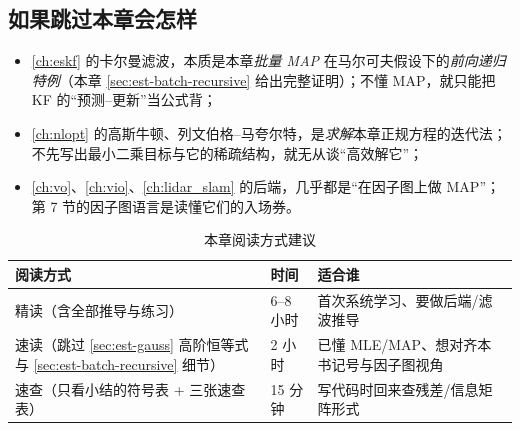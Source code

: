 \subsection*{如果跳过本章会怎样}
\begin{itemize}
  \item \cref{ch:eskf} 的卡尔曼滤波，本质是本章\emph{批量 MAP} 在马尔可夫假设下的\emph{前向递归特例}（本章 \cref{sec:est-batch-recursive} 给出完整证明）；不懂 MAP，就只能把 KF 的“预测–更新”当公式背；
  \item \cref{ch:nlopt} 的高斯牛顿、列文伯格–马夸尔特，是\emph{求解}本章正规方程的迭代法；不先写出最小二乘目标与它的稀疏结构，就无从谈“高效解它”；
  \item \cref{ch:vo}、\cref{ch:vio}、\cref{ch:lidar_slam} 的后端，几乎都是“在因子图上做 MAP”；第 7 节的因子图语言是读懂它们的入场券。
\end{itemize}

\begin{table}[H]\centering\small
\caption{本章阅读方式建议}
\begin{tabular}{lll}
\toprule
阅读方式 & 时间 & 适合谁 \\
\midrule
精读（含全部推导与练习） & 6--8 小时 & 首次系统学习、要做后端/滤波推导 \\
速读（跳过 \cref{sec:est-gauss} 高阶恒等式与 \cref{sec:est-batch-recursive} 细节） & 2 小时 & 已懂 MLE/MAP、想对齐本书记号与因子图视角 \\
速查（只看小结的符号表 + 三张速查表） & 15 分钟 & 写代码时回来查残差/信息矩阵形式 \\
\bottomrule
\end{tabular}
\end{table}

